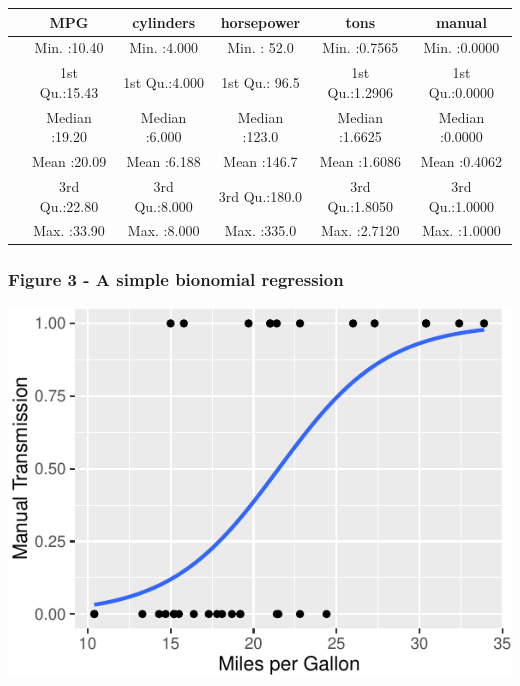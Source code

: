 \documentclass[]{article}
\begin{document}
\begin{longtable}[c]{@{}lccccc@{}}
\toprule
& MPG & cylinders & horsepower & tons & manual\tabularnewline
\midrule
\endhead
& Min. :10.40 & Min. :4.000 & Min. : 52.0 & Min. :0.7565 & Min.
:0.0000\tabularnewline
& 1st Qu.:15.43 & 1st Qu.:4.000 & 1st Qu.: 96.5 & 1st Qu.:1.2906 & 1st
Qu.:0.0000\tabularnewline
& Median :19.20 & Median :6.000 & Median :123.0 & Median :1.6625 &
Median :0.0000\tabularnewline
& Mean :20.09 & Mean :6.188 & Mean :146.7 & Mean :1.6086 & Mean
:0.4062\tabularnewline
& 3rd Qu.:22.80 & 3rd Qu.:8.000 & 3rd Qu.:180.0 & 3rd Qu.:1.8050 & 3rd
Qu.:1.0000\tabularnewline
& Max. :33.90 & Max. :8.000 & Max. :335.0 & Max. :2.7120 & Max.
:1.0000\tabularnewline
\bottomrule
\end{longtable}

\subsubsection{Figure 3 - A simple bionomial
regression}\label{figure-3---a-simple-bionomial-regression}

\includegraphics{study_files/figure-latex/simple binomial fit-1.pdf}
\end{document}
